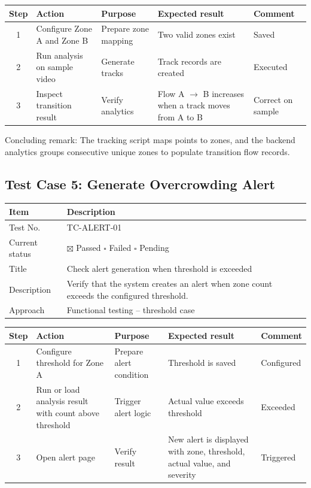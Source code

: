 \documentclass[12pt,a4paper]{report}
\begin{document}
\begin{longtable}{|c|p{4.2cm}|p{3.2cm}|p{4.2cm}|p{2cm}|}
\hline
\rowcolor{HeaderBlue}
\textbf{Step} & \textbf{Action} & \textbf{Purpose} & \textbf{Expected result} & \textbf{Comment} \\
\hline
1 & Configure Zone A and Zone B & Prepare zone mapping & Two valid zones exist & Saved \\
\hline
2 & Run analysis on sample video & Generate tracks & Track records are created & Executed \\
\hline
3 & Inspect transition result & Verify analytics & Flow A $\rightarrow$ B increases when a track moves from A to B & Correct on sample \\
\hline
\end{longtable}

Concluding remark: The tracking script maps points to zones, and the backend analytics groups consecutive unique zones to populate transition flow records.

\subsection{Test Case 5: Generate Overcrowding Alert}
\begin{longtable}{|p{4cm}|p{10cm}|}
\hline
\rowcolor{HeaderBlue}\textbf{Item} & \textbf{Description} \\
\hline
Test No. & TC-ALERT-01 \\
\hline
Current status & $\boxtimes$ Passed \quad $\square$ Failed \quad $\square$ Pending \\
\hline
Title & Check alert generation when threshold is exceeded \\
\hline
Description & Verify that the system creates an alert when zone count exceeds the configured threshold. \\
\hline
Approach & Functional testing -- threshold case \\
\hline
\end{longtable}

\begin{longtable}{|c|p{3.6cm}|p{3.6cm}|p{3.6cm}|p{2cm}|}
\hline
\rowcolor{HeaderBlue}
\textbf{Step} & \textbf{Action} & \textbf{Purpose} & \textbf{Expected result} & \textbf{Comment} \\
\hline
1 & Configure threshold for Zone A & Prepare alert condition & Threshold is saved & Configured \\
\hline
2 & Run or load analysis result with count above threshold & Trigger alert logic & Actual value exceeds threshold & Exceeded \\
\hline
3 & Open alert page & Verify result & New alert is displayed with zone, threshold, actual value, and severity & Triggered \\
\hline
\end{longtable}
\end{document}
